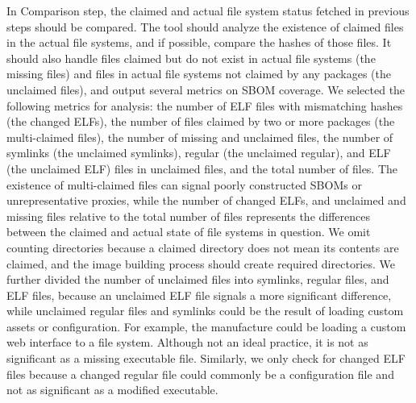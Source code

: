 In Comparison step, the claimed and actual file system status fetched in previous steps should be compared. The tool should analyze the existence of claimed files in the actual file systems, and if possible, compare the hashes of those files. It should also handle files claimed but do not exist in actual file systems (the missing files) and files in actual file systems not claimed by any packages (the unclaimed files), and output several metrics on SBOM coverage. We selected the following metrics for analysis: the number of ELF files with mismatching hashes (the changed ELFs), the number of files claimed by two or more packages (the multi-claimed files), the number of missing and unclaimed files, the number of symlinks (the unclaimed symlinks), regular (the unclaimed regular), and ELF (the unclaimed ELF) files in unclaimed files, and the total number of files. The existence of multi-claimed files can signal poorly constructed SBOMs or unrepresentative proxies, while the number of changed ELFs, and unclaimed and missing files relative to the total number of files represents the differences between the claimed and actual state of file systems in question. We omit counting directories because a claimed directory does not mean its contents are claimed, and the image building process should create required directories. We further divided the number of unclaimed files into symlinks, regular files, and ELF files, because an unclaimed ELF file signals a more significant difference, while unclaimed regular files and symlinks could be the result of loading custom assets or configuration. For example, the manufacture could be loading a custom web interface to a file system. Although not an ideal practice, it is not as significant as a missing executable file. Similarly, we only check for changed ELF files because a changed regular file could commonly be a configuration file and not as significant as a modified executable. %
